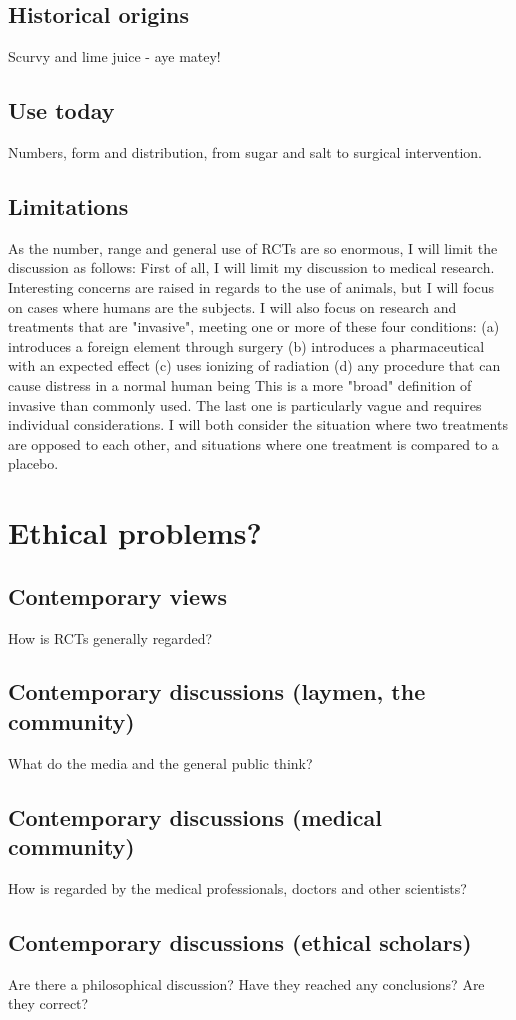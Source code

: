 \documentclass[12p]{article}
\begin{document}
\subsection*{Historical origins}
Scurvy and lime juice - aye matey!
\subsection*{Use today}
Numbers, form and distribution, from sugar and salt to surgical intervention.
\subsection*{Limitations}
As the number, range and general use of RCTs are so enormous, I will limit the discussion as follows:
First of all, I will limit my discussion to medical research.
Interesting concerns are raised in regards to the use of animals, but I will focus on cases where humans are the subjects.
I will also focus on research and treatments that are "invasive", meeting one or more of these four conditions:
(a) introduces a foreign element through surgery 
(b) introduces a pharmaceutical with an expected effect
(c) uses ionizing of radiation
(d) any procedure that can cause distress in a normal human being
This is a more "broad" definition of invasive than commonly used.
The last one is particularly vague and requires individual considerations.
I will both consider the situation where two treatments are opposed to each other, and situations where one treatment is compared to a placebo.
\section*{Ethical problems?}
\subsection*{Contemporary views}
How is RCTs generally regarded?
\subsection*{Contemporary discussions (laymen, the community)}
What do the media and the general public think?
\subsection*{Contemporary discussions (medical community)}
How is regarded by the medical professionals, doctors and other scientists?
\subsection*{Contemporary discussions (ethical scholars)}
Are there a philosophical discussion? Have they reached any conclusions? Are they correct?
\end{document}
